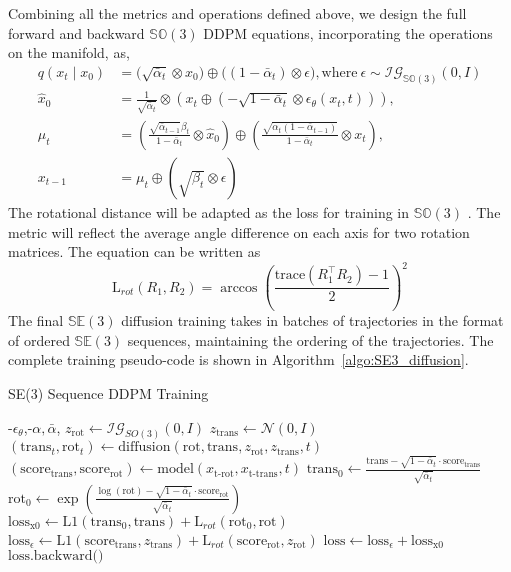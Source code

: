 Combining all the metrics and operations defined above, we design the full forward and backward $\mathbb{SO}(3)$ DDPM equations, incorporating the operations on the manifold, as,
\begin{align}
q(x_t \mid x_0) &= \bigl(\sqrt{\bar{\alpha}_t} \otimes x_0\bigr) \oplus \bigl((1 - \bar{\alpha}_t) \otimes \epsilon \bigr), \text{where}\  \epsilon\!\sim\!\mathcal{IG}_{\mathbb{SO}(3)}(0, I)\nonumber\\
\widehat{x}_0 \!&= \!\frac{1}{\sqrt{\bar{\alpha}_t}} \!\otimes\!\left(x_t \oplus \left(- \sqrt{1 - \bar{\alpha}_t} \!\otimes \!\epsilon_\theta(x_t, t)\right)\right), \\
\mu_t &= \left(\frac{\sqrt{\bar{\alpha}_{t-1}} \beta_t}{1 - \bar{\alpha}_t} \otimes \widehat{x}_0\right) \oplus \nonumber  \left(\frac{\sqrt{\alpha_t (1 - \bar{\alpha}_{t-1})}}{1 - \bar{\alpha}_t} \otimes x_t\right), \\
x_{t-1} &=\!\mu_t\!\oplus\!\left(\!\sqrt{\beta_t} \!\otimes \epsilon\right)
\end{align}
The rotational distance will be adapted as the loss for training in $\mathbb{SO}(3)$ . The metric will reflect the average angle difference on each axis for two rotation matrices. The equation can be written as
$$\text{L}_{rot}(R_1, R_2) = \arccos\left(\frac{\mathrm{trace}(R_1^{\top} R_2) - 1}{2}\right)^2$$ 
The final $\mathbb{SE}(3)$ diffusion training takes in batches of trajectories in the format of ordered $\mathbb{SE}(3)$ sequences, maintaining the ordering of the trajectories. The complete training pseudo-code is shown in Algorithm~\ref{algo:SE3_diffusion}.

\begin{algorithm}[t]
\caption{SE(3) Sequence DDPM Training}
\label{algo:SE3_diffusion}
\begin{algorithmic}[1]
    \Require {}-$\epsilon_\theta$,-$\alpha, \bar\alpha$, 
        \State $z_{\text{rot}} \gets \mathcal{IG}_{SO(3)}(0, I)$
        \State $z_{\text{trans}} \gets \mathcal{N}(0, I)$
        \State $(\text{trans}_t, \text{rot}_t) \gets \text{diffusion}(\text{rot}, \text{trans}, z_{\text{rot}}, z_{\text{trans}}, t)$
        \State $(\text{score}_{\text{trans}}, \text{score}_{\text{rot}}) \gets \text{model}(x_{\text{t-rot}}, x_{\text{t-trans}}, t)$
        \State $\text{trans}_0 \gets \frac{\text{trans} - \sqrt{1 - \bar{\alpha}_t} \cdot \text{score}_{\text{trans}}}{\sqrt{\bar{\alpha}_t}}$
        \State $\text{rot}_0 \gets \exp\left(\frac{\log(\text{rot}) - \sqrt{1 - \bar{\alpha}_t} \cdot \text{score}_{\text{rot}}}{\sqrt{\bar{\alpha}_t}}\right)$
        \State $\text{loss}_{\text{x0}} \gets \text{L1}(\text{trans}_0, \text{trans}) + \text{L}_{rot}(\text{rot}_0, \text{rot})$
        \State $\text{loss}_{\epsilon} \gets \text{L1}(\text{score}_{\text{trans}}, z_{\text{trans}}) + \text{L}_{rot}(\text{score}_{\text{rot}}, z_{\text{rot}})$
        \State $\text{loss} \gets \text{loss}_{\epsilon} + \text{loss}_{\text{x0}}$
        \State $\text{loss.backward()}$
    \EndWhile
\end{algorithmic}
\end{algorithm}

